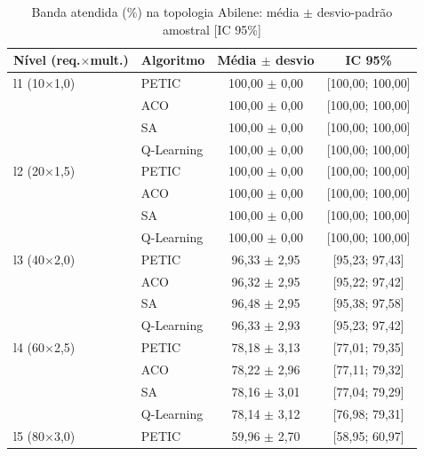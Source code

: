 \begin{table}[htb]
    \centering
    \small
    \caption{Banda atendida (\%) na topologia Abilene: média $\pm$ desvio-padrão amostral [IC 95\%]}
    \label{tab:banda-abilene}
    \begin{tabular}{llcc}
        \hline
        Nível (req.$\times$mult.) & Algoritmo & Média $\pm$ desvio & IC 95\% \\
        \hline
        l1 (10$\times$1,0) & PETIC & 100,00 $\pm$ 0,00 & [100,00; 100,00] \\
         & ACO & 100,00 $\pm$ 0,00 & [100,00; 100,00] \\
         & SA & 100,00 $\pm$ 0,00 & [100,00; 100,00] \\
         & Q-Learning & 100,00 $\pm$ 0,00 & [100,00; 100,00] \\
        \hline
        l2 (20$\times$1,5) & PETIC & 100,00 $\pm$ 0,00 & [100,00; 100,00] \\
         & ACO & 100,00 $\pm$ 0,00 & [100,00; 100,00] \\
         & SA & 100,00 $\pm$ 0,00 & [100,00; 100,00] \\
         & Q-Learning & 100,00 $\pm$ 0,00 & [100,00; 100,00] \\
        \hline
        l3 (40$\times$2,0) & PETIC & 96,33 $\pm$ 2,95 & [95,23; 97,43] \\
         & ACO & 96,32 $\pm$ 2,95 & [95,22; 97,42] \\
         & SA & 96,48 $\pm$ 2,95 & [95,38; 97,58] \\
         & Q-Learning & 96,33 $\pm$ 2,93 & [95,23; 97,42] \\
        \hline
        l4 (60$\times$2,5) & PETIC & 78,18 $\pm$ 3,13 & [77,01; 79,35] \\
         & ACO & 78,22 $\pm$ 2,96 & [77,11; 79,32] \\
         & SA & 78,16 $\pm$ 3,01 & [77,04; 79,29] \\
         & Q-Learning & 78,14 $\pm$ 3,12 & [76,98; 79,31] \\
        \hline
        l5 (80$\times$3,0) & PETIC & 59,96 $\pm$ 2,70 & [58,95; 60,97] \\

\end{tabular}
\end{table}
